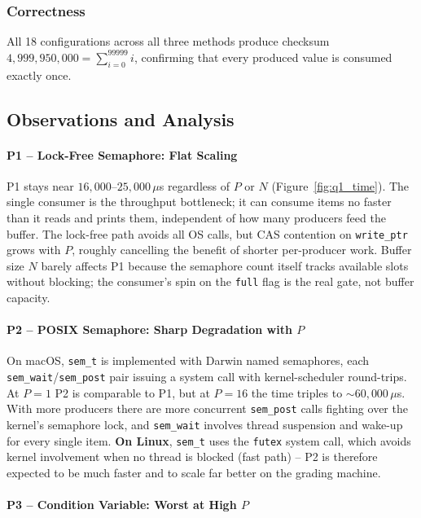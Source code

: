 \documentclass{article}
\begin{document}
\subsubsection{Correctness}

All 18 configurations across all three methods produce checksum
$4{,}999{,}950{,}000 = \sum_{i=0}^{99999} i$, confirming that every
produced value is consumed exactly once.

\subsection{Observations and Analysis}

\paragraph{P1 -- Lock-Free Semaphore: Flat Scaling}

P1 stays near $16{,}000$--$25{,}000\,\mu$s regardless of $P$ or $N$
(Figure~\ref{fig:q1_time}). The single consumer is the throughput
bottleneck; it can consume items no faster than it reads and prints them,
independent of how many producers feed the buffer. The lock-free path
avoids all OS calls, but CAS contention on \texttt{write\_ptr} grows
with $P$, roughly cancelling the benefit of shorter per-producer work.
Buffer size $N$ barely affects P1 because the semaphore count itself
tracks available slots without blocking; the consumer's spin on the
\texttt{full} flag is the real gate, not buffer capacity.

\paragraph{P2 -- POSIX Semaphore: Sharp Degradation with $P$}

On macOS, \texttt{sem\_t} is implemented with Darwin named semaphores,
each \texttt{sem\_wait}/\texttt{sem\_post} pair issuing a system call
with kernel-scheduler round-trips. At $P=1$ P2 is comparable to P1,
but at $P=16$ the time triples to $\sim60{,}000\,\mu$s. With more
producers there are more concurrent \texttt{sem\_post} calls fighting
over the kernel's semaphore lock, and \texttt{sem\_wait} involves
thread suspension and wake-up for every single item.
\textbf{On Linux}, \texttt{sem\_t} uses the \texttt{futex} system call,
which avoids kernel involvement when no thread is blocked (fast path) --
P2 is therefore expected to be much faster and to scale far better on
the grading machine.

\paragraph{P3 -- Condition Variable: Worst at High $P$}
\end{document}
